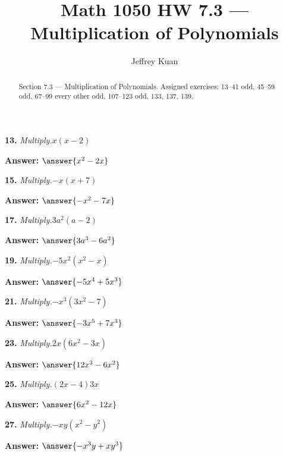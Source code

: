 \documentclass{ximera}
\author{Jeffrey Kuan}
\title{Math 1050 HW 7.3 --- Multiplication of Polynomials}
\begin{document}
\begin{abstract}
    Section 7.3 --- Multiplication of Polynomials.
    Assigned exercises: 13–41 odd, 45–59 odd, 67–99 every other odd, 107–123 odd, 133, 137, 139.
\end{abstract}

\maketitle

\begin{problem}
\textbf{13.} \emph{Multiply.}\quad $x(x - 2)$

\textbf{Answer:} $\answer{x^2 -2x}$
\end{problem}

\begin{problem}
\textbf{15.} \emph{Multiply.}\quad $-x(x + 7)$

\textbf{Answer:} $\answer{-x^2 -7x}$
\end{problem}

\begin{problem}
\textbf{17.} \emph{Multiply.}\quad $3a^2(a - 2)$

\textbf{Answer:} $\answer{3a^3 -6a^2}$
\end{problem}

\begin{problem}
\textbf{19.} \emph{Multiply.}\quad $-5x^2(x^2 - x)$

\textbf{Answer:} $\answer{-5x^4 +5x^3}$
\end{problem}

\begin{problem}
\textbf{21.} \emph{Multiply.}\quad $-x^3(3x^2 - 7)$

\textbf{Answer:} $\answer{-3x^5 +7x^3}$
\end{problem}

\begin{problem}
\textbf{23.} \emph{Multiply.}\quad $2x(6x^2 - 3x)$

\textbf{Answer:} $\answer{12x^3 -6x^2}$
\end{problem}

\begin{problem}
\textbf{25.} \emph{Multiply.}\quad $(2x - 4)3x$

\textbf{Answer:} $\answer{6x^2 -12x}$
\end{problem}

\begin{problem}
\textbf{27.} \emph{Multiply.}\quad $-xy(x^2 - y^2)$

\textbf{Answer:} $\answer{-x^3y +xy^3}$
\end{problem}
\end{document}
